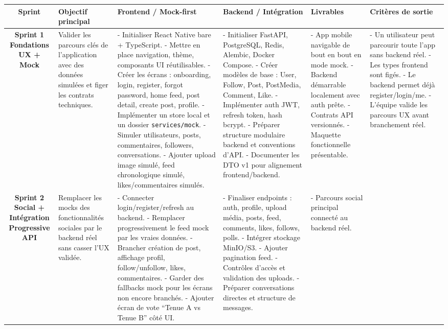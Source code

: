 \begin{table}[H]
\centering
\scriptsize
\renewcommand{\arraystretch}{1.35}
\begin{tabularx}{\textwidth}{|c|X|X|X|X|X|}
\hline
\textbf{Sprint} & \textbf{Objectif principal} & \textbf{Frontend / Mock-first} & \textbf{Backend / Intégration} & \textbf{Livrables} & \textbf{Critères de sortie} \\
\hline
\textbf{Sprint 1\\Fondations UX + Mock} &
Valider les parcours clés de l'application avec des données simulées et figer les contrats techniques. &
- Initialiser React Native bare + TypeScript.
- Mettre en place navigation, thème, composants UI réutilisables.
- Créer les écrans : onboarding, login, register, forgot password, home feed, post detail, create post, profile.
- Implémenter un store local et un dossier \texttt{services/mock}.
- Simuler utilisateurs, posts, commentaires, followers, conversations.
- Ajouter upload image simulé, feed chronologique simulé, likes/commentaires simulés. &
- Initialiser FastAPI, PostgreSQL, Redis, Alembic, Docker Compose.
- Créer modèles de base : User, Follow, Post, PostMedia, Comment, Like.
- Implémenter auth JWT, refresh token, hash bcrypt.
- Préparer structure modulaire backend et conventions d'API.
- Documenter les DTO v1 pour alignement frontend/backend. &
- App mobile navigable de bout en bout en mode mock.
- Backend démarrable localement avec auth prête.
- Contrats API versionnés.
- Maquette fonctionnelle présentable. &
- Un utilisateur peut parcourir toute l'app sans backend réel.
- Les types frontend sont figés.
- Le backend permet déjà register/login/me.
- L'équipe valide les parcours UX avant branchement réel. \\
\hline
\textbf{Sprint 2\\Social + Intégration Progressive API} &
Remplacer les mocks des fonctionnalités sociales par le backend réel sans casser l'UX validée. &
- Connecter login/register/refresh au backend.
- Remplacer progressivement le feed mock par les vraies données.
- Brancher création de post, affichage profil, follow/unfollow, likes, commentaires.
- Garder des fallbacks mock pour les écrans non encore branchés.
- Ajouter écran de vote ``Tenue A vs Tenue B'' côté UI. &
- Finaliser endpoints : auth, profile, upload média, posts, feed, comments, likes, follows, polls.
- Intégrer stockage MinIO/S3.
- Ajouter pagination feed.
- Contrôles d'accès et validation des uploads.
- Préparer conversations directes et structure de messages. &
- Parcours social principal connecté au backend réel.

\end{tabularx}
\end{table}
